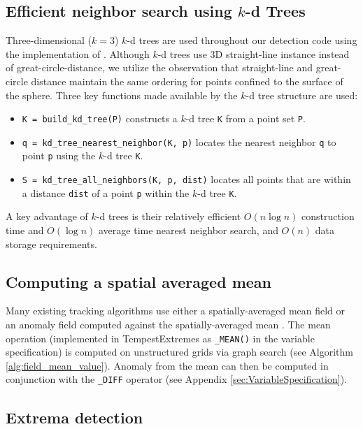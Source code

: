 \documentclass[gmdd, hvmath]{copernicus}
\begin{document}
\subsection{Efficient neighbor search using $k$-d Trees}

Three-dimensional ($k=3$) $k$-d trees \citep{bentley1975multidimensional} are used throughout our detection code using the implementation of \cite{tsiombikas2015kdtree}.  Although $k$-d trees use 3D straight-line instance instead of great-circle-distance, we utilize the observation that straight-line and great-circle distance maintain the same ordering for points confined to the surface of the sphere.  Three key functions made available by the $k$-d tree structure are used:
\begin{itemize}
\item[] \texttt{K = build\_kd\_tree(P)} constructs a $k$-d tree \texttt{K} from a point set \texttt{P}.
\item[] \texttt{q = kd\_tree\_nearest\_neighbor(K, p)} locates the nearest neighbor \texttt{q} to point \texttt{p} using the $k$-d tree \texttt{K}.
\item[] \texttt{S = kd\_tree\_all\_neighbors(K, p, dist)} locates all points that are within a distance \texttt{dist} of a point \texttt{p} within the $k$-d tree \texttt{K}.
\end{itemize}

\noindent A key advantage of $k$-d trees is their relatively efficient $O(n \log n)$ construction time and $O(\log n)$ average time nearest neighbor search, and $O(n)$ data storage requirements.

\subsection{Computing a spatial averaged mean}

Many existing tracking algorithms use either a spatially-averaged mean field or an anomaly field computed against the spatially-averaged mean \citep{haarsma1993tropical,bengtsson1995hurricane}.  The mean operation (implemented in TempestExtremes as \texttt{\_MEAN()} in the variable specification) is computed on unstructured grids via graph search (see Algorithm \ref{alg:field_mean_value}).  Anomaly from the mean can then be computed in conjunction with the \texttt{\_DIFF} operator (see Appendix \ref{sec:VariableSpecification}).

\subsection{Extrema detection}
\end{document}
